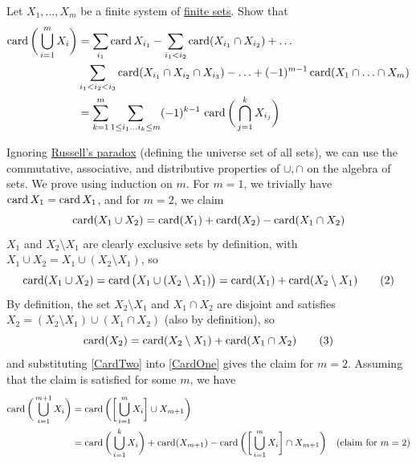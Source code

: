   \begin{exercise}[Zorich 2.4.6]
    Let $X_1, \ldots, X_m$ be a finite system of \hyperref[st-def:finite-set]{finite sets}. Show that 
    \begin{align*}
      \operatorname*{card} \bigg( \bigcup_{i=1}^m X_i \bigg) & = \sum_{i_1} \operatorname*{card}{X_{i_1}} - \sum_{i_1 < i_2} \operatorname*{card}(X_{i_1} \cap X_{i_2}) + \ldots \\
      & \sum_{i_1 < i_2 < i_3} \operatorname*{card}(X_{i_1} \cap X_{i_2} \cap X_{i_3}) - \ldots + (-1)^{m-1} \operatorname*{card} (X_1 \cap \ldots \cap X_m) \\
      & = \sum_{k=1}^{m} \sum_{1 \leq i_1 \ldots i_k \leq m} (-1)^{k-1} \, \operatorname*{card}\bigg( \bigcap_{j=1}^k X_{i_j} \bigg)
    \end{align*}
  \end{exercise}
  \begin{solution}
    Ignoring \hyperref[st-thm:russells-paradox]{Russell's paradox} (defining the universe set of all sets), we can use the commutative, associative, and distributive properties of $\cup, \cap$ on the algebra of sets. We prove using induction on $m$. For $m=1$, we trivially have $\operatorname*{card}{X_1} = \operatorname*{card}{X_1}$, and for $m = 2$, we claim 
    \begin{equation}
      \operatorname*{card}( X_1 \cup X_2) = \operatorname*{card}(X_1) + \operatorname*{card}(X_2) - \operatorname*{card}(X_1 \cap X_2)
    \end{equation}
    $X_1$ and $X_2 \setminus X_1$ are clearly exclusive sets by definition, with $X_1 \cup X_2 = X_1 \cup (X_2 \setminus X_1)$, so 
    \begin{equation}
      \operatorname*{card}(X_1 \cup X_2) = \operatorname*{card}\big( X_1 \cup (X_2 \setminus X_1) \big) = \operatorname*{card}(X_1) + \operatorname*{card}(X_2 \setminus X_1) \tag{2} \label{CardOne}
    \end{equation}
    By definition, the set $X_2 \setminus X_1$ and $X_1 \cap X_2$ are disjoint and satisfies $X_2 = (X_2 \setminus X_1) \cup (X_1 \cap X_2)$ (also by definition), so 
    \begin{equation}
      \operatorname*{card}(X_2) = \operatorname*{card}(X_2 \setminus X_1) + \operatorname*{card}(X_1 \cap X_2) \tag{3} \label{CardTwo}
    \end{equation}
    and substituting \eqref{CardTwo} into \eqref{CardOne} gives the claim for $m=2$. Assuming that the claim is satisfied for some $m$, we have 
    \begin{align*}
      \card \bigg( \bigcup_{i=1}^{m+1} X_i \bigg) & = \card \bigg( \bigg[ \bigcup_{i=1}^m X_i \bigg] \cup X_{m+1} \bigg) & \\
      & = \card \bigg( \bigcup_{i=1}^k X_i \bigg) + \card(X_{m+1}) - \card\bigg( \bigg[ \bigcup_{i=1}^m X_i\bigg] \cap X_{m+1} \bigg) & (\text{claim for } m=2) \\

\end{align*}
\end{solution}
